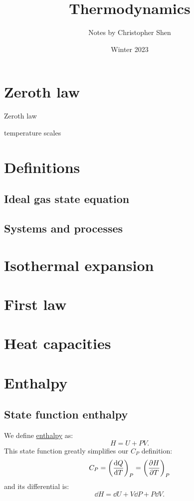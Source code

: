 \documentclass{article}
\title{Thermodynamics}
\author{Notes by Christopher Shen}
\date{Winter 2023}
\begin{document}
\maketitle
\newpage

\tableofcontents
\newpage

\pagestyle{fancy}
\fancyhead{}

\section{Zeroth law}

Zeroth law

temperature scales

\newpage

\section{Definitions}

\subsection{Ideal gas state equation}

\subsection{Systems and processes}

\newpage

\section{Isothermal expansion}


\section{First law}

\newpage

\section{Heat capacities}

\newpage

\section{Enthalpy}

\subsection{State function enthalpy}
We define \underline{enthalpy} as:
$$H=U+PV.$$
This state function greatly simplifies our $C_P$
definition:
$$C_P=\left(\dv{Q}{T}\right)_P=\left(
\frac{\partial H}{\partial T}\right)_P$$
and its differential is:
$$\dd H=\dd U+V\dd P+P\dd V.$$
\end{document}

